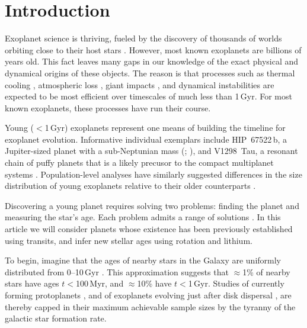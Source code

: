 \documentclass[11pt,twocolumn,tighten]{aastex63}
\begin{document}

\section{Introduction}
\label{sec:intro}

Exoplanet science is thriving, fueled by the discovery of thousands of
worlds orbiting close to their host stars
\citep{Borucki10,2015JATIS...1a4003R}.  However, most known exoplanets
are billions of years old.  This fact leaves many gaps in our
knowledge of the exact physical and dynamical origins of these
objects.  The reason is that processes such as thermal cooling
\citep{2007ApJ...659.1661F}, atmospheric loss
\citep{2019AREPS..47...67O}, giant impacts
\citep{2014prpl.conf..595R}, and dynamical instabilities
\citep{2017MNRAS.470.1750I} are expected to be most efficient over
timescales of much less than 1\,Gyr.  For most known exoplanets, these
processes have run their course.

Young ($<$1\,Gyr) exoplanets represent one means of building the
timeline for exoplanet evolution.  Informative individual exemplars
include HIP~67522\,b, a Jupiter-sized planet with a sub-Neptunian mass
(\citealt{Rizzuto_2020}; \citealt{Thao2024}), and V1298~Tau, a
resonant chain of puffy planets that is a likely precusor to the
compact multiplanet systems \citep{David_2019}.  Population-level
analyses have similarly suggested differences in the size distribution
of young exoplanets relative to their older counterparts
\citep{Berger_2020b_rpage,David_2021,Sandoval_2021,2023AJ....166..248C,Vach2024}.

Discovering a young planet requires solving two problems: finding the
planet and measuring the star's age.  Each problem admits a range of
solutions
\citep[e.g.][]{2008Sci...322.1348M,2012ApJ...756L..33Q,2024AJ....167..193T}.
In this article we will consider planets whose existence has been
previously established using transits, and infer new stellar ages
using rotation and lithium.

To begin, imagine that the ages of nearby stars in the Galaxy are
uniformly distributed from 0--10\,Gyr
\citep[][]{2000MNRAS.318..658B,Nordstrom_2004}.  This approximation
suggests that $\approx$1\% of nearby stars have ages $t$$<$100\,Myr, and
$\approx$10\% have $t$$<$1\,Gyr.  Studies of currently forming
protoplanets \citep{2018A&A...617A..44K}, and of exoplanets evolving
just after disk dispersal \citep[e.g.][]{2022MNRAS.512.5067K}, are
thereby capped in their maximum achievable sample sizes by the tyranny
of the galactic star formation rate.
\end{document}
